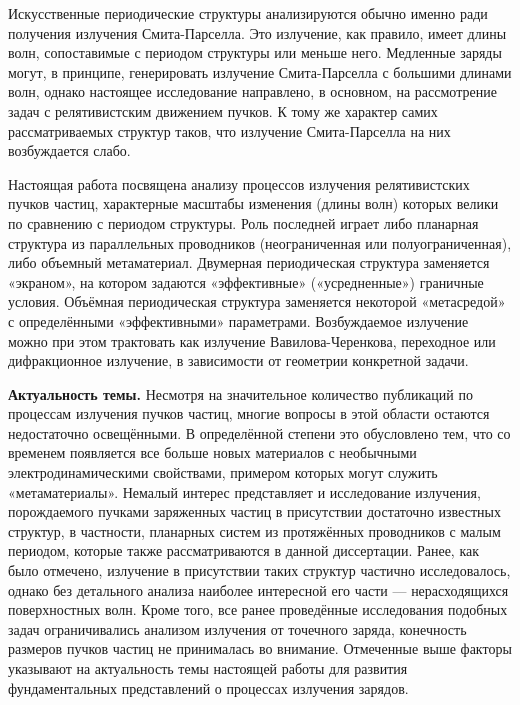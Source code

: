 Искусственные периодические структуры анализируются обычно именно ради получения излучения Смита-Парселла. Это излучение, как правило, имеет длины волн, сопоставимые с периодом структуры или меньше него. Медленные заряды могут, в принципе, генерировать излучение Смита-Парселла с большими длинами волн, однако настоящее исследование направлено, в основном, на рассмотрение задач с релятивистским движением пучков. К тому же характер самих рассматриваемых структур таков, что излучение Смита-Парселла на них возбуждается слабо.

Настоящая работа посвящена анализу процессов излучения релятивистских пучков частиц, характерные масштабы изменения (длины волн) которых велики по сравнению с периодом структуры. Роль последней играет либо планарная структура из параллельных проводников (неограниченная или полуограниченная), либо объемный метаматериал. Двумерная периодическая структура заменяется «экраном», на котором задаются «эффективные» («усредненные») граничные условия. Объёмная периодическая структура заменяется некоторой «метасредой» с определёнными «эффективными» параметрами. Возбуждаемое излучение можно при этом трактовать как излучение Вавилова-Черенкова, переходное или дифракционное излучение, в зависимости от геометрии конкретной задачи.

\hfill

\textbf{Актуальность темы.} Несмотря на значительное количество публикаций по процессам излучения пучков частиц, многие вопросы в этой области остаются недостаточно освещёнными. В определённой степени это обусловлено тем, что со временем появляется все больше новых материалов с необычными электродинамическими свойствами, примером которых могут служить «метаматериалы». Немалый интерес представляет и исследование излучения, порождаемого пучками заряженных частиц в присутствии достаточно известных структур, в частности, планарных систем из протяжённых проводников с малым периодом, которые также рассматриваются в данной диссертации. Ранее, как было отмечено, излучение в присутствии таких структур частично исследовалось, однако без детального анализа наиболее интересной его части — нерасходящихся поверхностных волн. Кроме того, все ранее проведённые исследования подобных задач ограничивались анализом излучения от точечного заряда, конечность размеров пучков частиц не принималась во внимание. Отмеченные выше факторы указывают на актуальность темы настоящей работы для развития фундаментальных представлений о процессах излучения зарядов.

